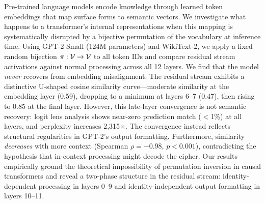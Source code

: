 Pre-trained language models encode knowledge through learned token embeddings that map surface forms to semantic vectors. We investigate what happens to a transformer's internal representations when this mapping is systematically disrupted by a bijective permutation of the vocabulary at inference time. Using GPT-2 Small (124M parameters) and WikiText-2, we apply a fixed random bijection $\pi: \mathcal{V} \to \mathcal{V}$ to all token IDs and compare residual stream activations against normal processing across all 12 layers. We find that the model \emph{never} recovers from embedding misalignment. The residual stream exhibits a distinctive U-shaped cosine similarity curve---moderate similarity at the embedding layer (0.59), dropping to a minimum at layers 6--7 (0.47), then rising to 0.85 at the final layer. However, this late-layer convergence is not semantic recovery: logit lens analysis shows near-zero prediction match ($<$1\%) at all layers, and perplexity increases 2,315$\times$. The convergence instead reflects structural regularities in GPT-2's output formatting. Furthermore, similarity \emph{decreases} with more context (Spearman $\rho = -0.98$, $p < 0.001$), contradicting the hypothesis that in-context processing might decode the cipher. Our results empirically ground the theoretical impossibility of permutation inversion in causal transformers and reveal a two-phase structure in the residual stream: identity-dependent processing in layers 0--9 and identity-independent output formatting in layers 10--11.
